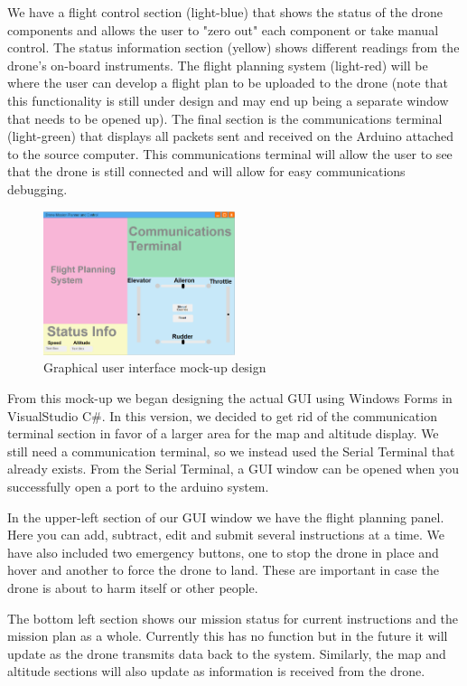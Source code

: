 \documentclass[12pt,a4paper]{article}
\begin{document}
We have a flight control section (light-blue) that shows the status of the drone components and allows the user to "zero out" each component or take manual control. The status information section (yellow) shows different readings from the drone's on-board instruments. The flight planning system (light-red) will be where the user can develop a flight plan to be uploaded to the drone (note that this functionality is still under design and may end up being a separate window that needs to be opened up). The final section is the communications terminal (light-green) that displays all packets sent and received on the Arduino attached to the source computer. This communications terminal will allow the user to see that the drone is still connected and will allow for easy communications debugging.

	\begin{figure}[h!]

  		\centering
    	\includegraphics[width=0.5\textwidth]{guiMockup.png}
   		\caption{Graphical user interface mock-up design}
	\end{figure}
\pagebreak
From this mock-up we began designing the actual GUI using Windows Forms in VisualStudio C#.  In this version, we decided to get rid of the communication terminal section in favor of a larger area for the map and altitude display.  We still need a communication terminal, so we instead used the Serial Terminal that already exists.  From the Serial Terminal, a GUI window can be opened when you successfully open a port to the arduino system. 

In the upper-left section of our GUI window we have the flight planning panel.  Here you can add, subtract, edit and submit several instructions at a time.  We have also included two emergency buttons, one to stop the drone in place and hover and another to force the drone to land.  These are important in case the drone is about to harm itself or other people.

The bottom left section shows our mission status for current instructions and the mission plan as a whole.
Currently this has no function but in the future it will update as the drone transmits data back to the system.  Similarly, the map and altitude sections will also update as information is received from the drone.
\end{document}
